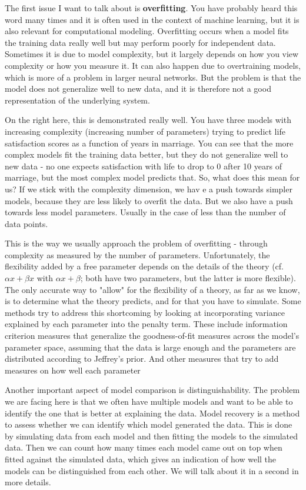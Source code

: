 \documentclass[12pt]{article}
\begin{document}
The first issue I want to talk about is \textbf{overfitting}. You have probably heard this word many times and it is often used in the context of machine learning, but it is also relevant for computational modeling. Overfitting occurs when a model fits the training data really well but may perform poorly for independent data. Sometimes it is due to model complexity, but it largely depends on how you view complexity or how you measure it. It can also happen due to overtraining models, which is more of a problem in larger neural networks. But the problem is that the model does not generalize well to new data, and it is therefore not a good representation of the underlying system.

On the right here, this is demonstrated really well. You have three models with increasing complexity (increasing number of parameters) trying to predict life satisfaction scores as a function of years in marriage. You can see that the more complex models fit the training data better, but they do not generalize well to new data - no one expects satisfaction with life to drop to 0 after 10 years of marriage, but the most complex model predicts that. So, what does this mean for us? If we stick with the complexity dimension, we hav e a push towards simpler models, because they are less likely to overfit the data. But we also have a push towards less model parameters. Usually in the case of less than the number of data points.

This is the way we usually approach the problem of overfitting - through complexity as measured by the number of parameters. Unfortunately, the flexibility added by a free parameter depends on the details of the theory (cf. $\alpha x + \beta x$ with $\alpha x + \beta$; both have two parameters, but the latter is more flexible). The only accurate way to "allow" for the flexibility of a theory, as far as we know, is to determine what the theory predicts, and for that you have to simulate. Some methods try to address this shortcoming by looking at incorporating variance explained by each parameter into the penalty term. These include information criterion measures that generalize the goodness-of-fit measures across the model's parameter space, assuming that the data is large enough and the parameters are distributed according to Jeffrey's prior. And other measures that try to add measures on how well each parameter 

Another important aspect of model comparison is distinguishability. The problem we are facing here is that we often have multiple models and want to be able to identify the one that is better at explaining the data. Model recovery is a method to assess whether we can identify which model generated the data. This is done by simulating data from each model and then fitting the models to the simulated data. Then we can count how many times each model came out on top when fitted against the simulated data, which gives an indication of how well the models can be distinguished from each other. We will talk about it in a second in more details.
\end{document}
